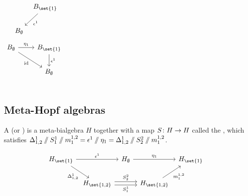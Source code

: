 \documentclass{beamer}
\begin{document}
\begin{frame}
\begin{columns}
\begin{equation*}
\begin{tikzcd}[ampersand replacement=\&,column sep=tiny]
                \&\&B_{\set{1}}
                        \dlar["\counit^{1}"] \\
                \&B_{\emptyset}
        \end{tikzcd}
        \end{equation*}
        \hline
        \begin{equation*}\label{eq:cd_unit_counit}
        \begin{tikzcd}[ampersand replacement=\&]
                B_{\emptyset}
                        \rar["\unit_{1}"]
                        \drar["\id"']
                \&B_{\set{1}}
                        \dar["\counit^{1}"] \\
                \&B_{\emptyset}
        \end{tikzcd}
        \end{equation*}
        \end{columns}
\end{frame}

\subsection{Meta-Hopf algebras}

\begin{frame}
        \begin{definition}
        A  (or ) is a
        meta-bialgebra $H$ together with a map $\map {\antipode} {H} {H}$ called
        the , which satisfies
        $\Delta^{1}_{1,2}\mathbin{/\mkern-6mu/} S^1_1 \mathbin{/\mkern-6mu/} m^{1,2}_1 =
        \epsilon^{1}\mathbin{/\mkern-6mu/}\eta_{1} =
        \Delta^{1}_{1,2}\mathbin{/\mkern-6mu/} S^2_2 \mathbin{/\mkern-6mu/} m^{1,2}_1$.
        \end{definition}
        \begin{equation*}
        \begin{tikzcd}[ampersand replacement=\&,column sep=tiny]
                \label{eq:cd_antipode}
                H_{\set{1}}
                        \arrow[rr, "\counit^{1}"] \arrow[rd, "\comult^{1}_{1,2}"']
                \&\& H_{\emptyset}
                        \arrow[rr, "\unit_{1}"]
                \&\& H_{\set{1}} \\
                \& H_{\set{1,2}}
                        \arrow[rr, "\antipode^{2}_{2}", shift left]
                        \arrow[rr, "\antipode^{1}_{1}"', shift right]
                \&\& H_{\set{1,2}} \arrow[ru, "\mult^{1,2}_{1}"']
        \end{tikzcd}
        \end{equation*}
\end{frame}
\end{document}
